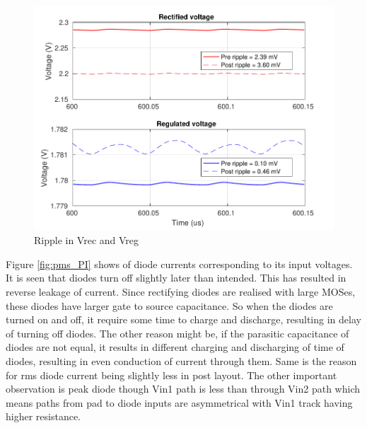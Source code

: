 \documentclass[12pt,a4paper,UKenglish]{report}
\begin{document}
\begin{figure} [H]
  \centering
  \includegraphics[width=\textwidth]{img/pms/pms2_ripple_both.pdf} 
 \caption{Ripple in Vrec and Vreg} 
\label{fig:pms_ripple} 
\end{figure}

Figure \ref{fig:pms_PI} shows of diode currents corresponding to its input voltages. It is seen that diodes turn off slightly later than intended. This has resulted in reverse leakage of current. Since rectifying  diodes are realised with large MOSes, these diodes have larger gate to source capacitance. So when the diodes are turned on and off, it require some time to charge and discharge, resulting in delay of turning off diodes. The other reason might be,  if the parasitic capacitance of diodes are not equal, it results in different charging and discharging of time of diodes, resulting in even conduction of current through them.
Same is the reason for rms diode current being slightly less in post layout. The other important observation is peak diode though Vin1 path is 
less than through Vin2 path which means paths from pad to diode inputs are asymmetrical with Vin1 track having higher resistance.\\
\end{document}
